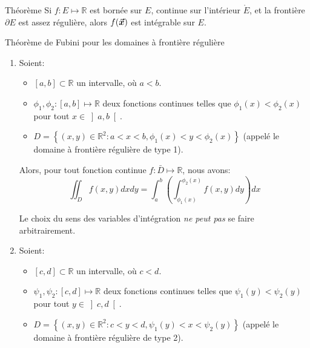 \documentclass[a4paper]{article}
\begin{document}
\begin{parag}{Théorème}
    Si $f : E \mapsto \mathbb{R}$ est bornée sur $E$, continue sur l'intérieur $\mathring{E}$, et la frontière $\partial E$ est assez régulière, alors $f\left(\bvec{x}\right)$ est intégrable sur $E$.
\end{parag}

\begin{parag}{Théorème de Fubini pour les domaines à frontière régulière}
    \begin{enumerate}[left=0pt]
        \item Soient:
            \begin{itemize}
                \item $\left[a, b\right] \subset \mathbb{R}$ un intervalle, où $a < b$.
                \item $\phi_1, \phi_2 : \left[a, b\right]\mapsto \mathbb{R}$ deux fonctions continues telles que $\phi_1\left(x\right) < \phi_2\left(x\right)$ pour tout $x \in \left]a, b\right[ $.
                \item $D = \left\{\left(x, y\right) \in \mathbb{R}^2 : a < x < b, \phi_1\left(x\right) < y < \phi_2\left(x\right)\right\}$ (appelé le domaine à frontière régulière de type 1).
            \end{itemize}
            
            Alors, pour tout fonction continue $f: \bar{D} \mapsto \mathbb{R}$, nous avons: 
            \[\iint_D f\left(x, y\right) dx dy = \int_{a}^{b} \left(\int_{\phi_1\left(x\right)}^{\phi_2\left(x\right)} f\left(x, y\right)dy\right)dx\]

            Le choix du sens des variables d'intégration \textit{ne peut pas} se faire arbitrairement.
        \item Soient:
            \begin{itemize}
                \item $\left[c, d\right] \subset \mathbb{R}$ un intervalle, où $c < d$.
                \item $\psi_1, \psi_2 : \left[c, d\right] \mapsto \mathbb{R}$ deux fonctions continues telles que $\psi_1\left(y\right) < \psi_2\left(y\right)$ pour tout $y \in \left]c, d\right[ $.
                \item $D = \left\{\left(x, y\right) \in \mathbb{R}^2 : c < y < d, \psi_1\left(y\right) < x < \psi_2\left(y\right)\right\}$ (appelé le domaine à frontière régulière de type 2).
            \end{itemize}
            

\end{enumerate}
\end{parag}
\end{document}
